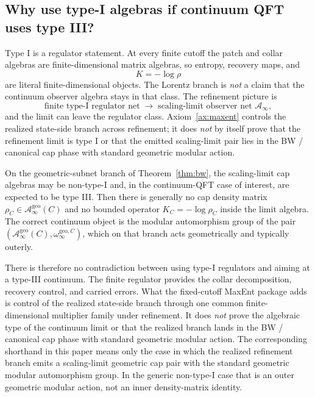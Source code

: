 \documentclass[11pt]{article}
\begin{document}
\subsection{Why use type-I algebras if continuum QFT uses type III?}

Type I is a regulator statement. At every finite cutoff the patch and collar algebras are finite-dimensional matrix algebras, so entropy, recovery maps, and
\[
K=-\log\rho
\]
are literal finite-dimensional objects. The Lorentz branch is \emph{not} a claim that the continuum observer algebra stays in that class. The refinement picture is
\[
\text{finite type-I regulator net}
\;\longrightarrow\;
\text{scaling-limit observer net } \mathcal A_\infty,
\]
and the limit can leave the regulator class. Axiom~\ref{ax:maxent} controls the realized state-side branch across refinement; it does \emph{not} by itself prove that the refinement limit is type I or that the emitted scaling-limit pair lies in the BW / canonical cap phase with standard geometric modular action.

On the geometric-subnet branch of Theorem~\ref{thm:bw}, the scaling-limit cap algebras may be non-type-I and, in the continuum-QFT case of interest, are expected to be type III. Then there is generally no cap density matrix \(\rho_C\in \mathcal A_\infty^{\mathrm{geo}}(C)\) and no bounded operator \(K_C=-\log\rho_C\) inside the limit algebra. The correct continuum object is the modular automorphism group of the pair \((\mathcal A_\infty^{\mathrm{geo}}(C),\omega_\infty^{\mathrm{geo},C})\), which on that branch acts geometrically and typically outerly.

There is therefore no contradiction between using type-I regulators and aiming at a type-III continuum. The finite regulator provides the collar decomposition, recovery control, and carried errors. What the fixed-cutoff MaxEnt package adds is control of the realized state-side branch through one common finite-dimensional multiplier family under refinement. It does \emph{not} prove the algebraic type of the continuum limit or that the realized branch lands in the BW / canonical cap phase with standard geometric modular action. The corresponding shorthand in this paper means only the case in which the realized refinement branch emits a scaling-limit geometric cap pair with the standard geometric modular automorphism group. In the generic non-type-I case that is an outer geometric modular action, not an inner density-matrix identity.
\end{document}

